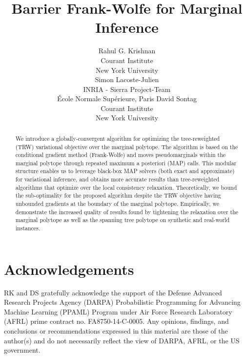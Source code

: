 \documentclass{article}
\title{Barrier Frank-Wolfe for Marginal Inference}
\author{
Rahul G. Krishnan \\
Courant Institute\\
New York University\\
%
\And
Simon Lacoste-Julien \\ 
INRIA - Sierra Project-Team\\
\'{E}cole Normale Sup\'{e}rieure, Paris
%
\And
David Sontag\\
Courant Institute\\
New York University\\
%
}
\theoremstyle{remark}
\begin{document}
\maketitle

\begin{abstract} 
We introduce a globally-convergent algorithm for optimizing the
tree-reweighted (TRW) variational objective over the marginal
polytope.
The algorithm is based on the conditional gradient method (Frank-Wolfe) 
and moves pseudomarginals within the marginal
polytope through repeated maximum a posteriori (MAP) calls.
%
This modular structure enables us 
to leverage black-box MAP solvers (both exact and approximate) for
variational inference, and obtains more accurate results than
tree-reweighted algorithms that optimize over the local consistency
relaxation.
%
Theoretically, we bound the sub-optimality for the proposed algorithm
despite the TRW objective having unbounded gradients at the boundary of the marginal polytope. 
%
Empirically, we demonstrate the increased quality of results found  
by tightening the relaxation over the marginal polytope as well 
as the spanning tree polytope on synthetic and real-world instances. 
\end{abstract} 






\vspace{-2mm}
\section*{Acknowledgements}
\vspace{-2mm}
%
%
%
%
%
%
%
%
RK and DS gratefully acknowledge the support of the Defense Advanced
Research Projects Agency (DARPA) Probabilistic Programming for
Advancing Machine Learning (PPAML) Program under Air Force Research
Laboratory (AFRL) prime contract no. FA8750-14-C-0005. Any opinions,
findings, and conclusions or recommendations expressed in this
material are those of the author(s) and do not necessarily reflect the
view of DARPA, AFRL, or the US government.
%

%
\small{

}

%
%
%
%

%
%
%
%
%
%
%
%
%
%
%
\clearpage %

\end{document}
